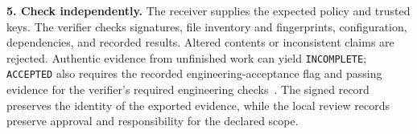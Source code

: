 \textbf{5. Check independently.} The receiver supplies the expected policy and trusted keys. The verifier checks signatures, file inventory and fingerprints, configuration, dependencies, and recorded results. Altered contents or inconsistent claims are rejected. Authentic evidence from unfinished work can yield \texttt{INCOMPLETE}; \texttt{ACCEPTED} also requires the recorded engineering-acceptance flag and passing evidence for the verifier's required engineering checks~\cite{scpCheckpoint}. The signed record preserves the identity of the exported evidence, while the local review records preserve approval and responsibility for the declared scope.
